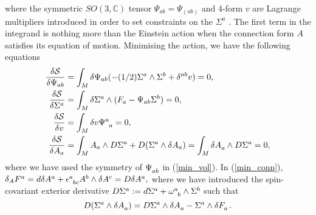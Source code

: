 \documentclass[a4paper,12pt, onecolumn, notitlepage]{article}
\theoremstyle{definition}
\theoremstyle{remark}
\newcommand{\w}{\omega}
\newcommand{\e}{\epsilon}
\begin{document}
where the symmetric $SO(3,\mathbb{C})$ tensor $\Psi_{ab}=\Psi_{(ab)}$ and 4-form $v$ are Lagrange multipliers introduced in order to set constraints on the $\Sigma^{a}$ \cite{capovilla_1989}. The first term in the integrand is nothing more than the Einstein action when the connection form $A$ satisfies its equation of motion. Minimising the action, we have the following equations
\begin{subequations}
\begin{align}
	\label{min_sym}
	\frac{\delta\mathcal{S}}{\delta\Psi_{ab}} &= \int_{M}\delta\Psi_{ab}(- (1/2)\Sigma^{a}\wedge\Sigma^{b} + \delta^{ab}v) = 0,\\
	\label{min_form}
	\frac{\delta\mathcal{S}}{\delta\Sigma^{a}} &= \int_{M}\delta\Sigma^{a}\wedge(F_{a} - \Psi_{ab}\Sigma^{b}) = 0,\\
	\label{min_vol}
	\frac{\delta\mathcal{S}}{\delta v} &= \int_{M}\delta v\Psi\indices{^a_a} = 0,\\
	\label{min_conn}
	\frac{\delta\mathcal{S}}{\delta A_{a}} &= \int_{M}A_{a}\wedge D\Sigma^{a} + D(\Sigma^{a}\wedge\delta A_{a}) = \int_{M}\delta A\indices{_a}\wedge D\Sigma\indices{^a} = 0,
	\end{align}
\end{subequations}
where we have used the symmetry of $\Psi\indices{_a_b}$ in (\ref{min_vol}). In (\ref{min_conn}), $\delta_{A} F\indices{^a}=d\delta A\indices{^a}+\e\indices{^a_b_c}A\indices{^b}\wedge \delta A\indices{^c} = D\delta A\indices{^a},$ where we have introduced the spin-covariant exterior derivative $D\Sigma\indices{^a} := d\Sigma\indices{^a}+ \w\indices{^a_b}\wedge\Sigma\indices{^b}$ such that
\begin{equation*}
	D(\Sigma\indices{^a}\wedge\delta A\indices{_a})=D\Sigma\indices{^a}\wedge\delta A\indices{_a} - \Sigma\indices{^a}\wedge \delta F\indices{_a}.
\end{equation*}
\end{document}
